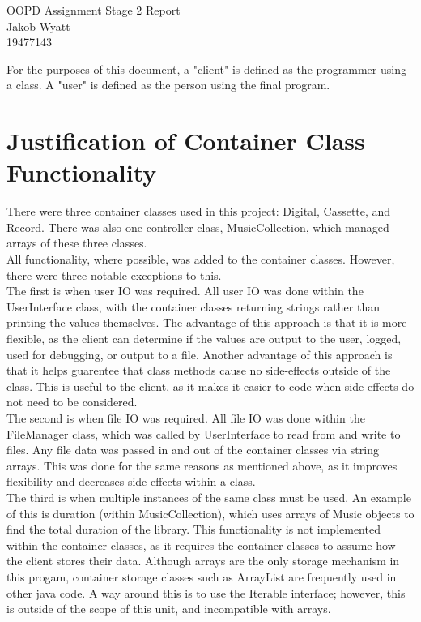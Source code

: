 \documentclass{article}
\begin{document}
\begin{center}
    \Huge
    OOPD Assignment Stage 2 Report\\
    \large
    Jakob Wyatt\\
    19477143
\end{center}

For the purposes of this document, a "client" is defined as the programmer
using a class. A "user" is defined as the person using the final program.

\section{Justification of Container Class Functionality}
There were three container classes used in this project:
Digital, Cassette, and Record. There was also one controller class,
MusicCollection, which managed arrays of these three classes.\\
All functionality, where possible, was added to the container classes.
However, there were three notable exceptions to this.\\
The first is when user IO was required. All user IO
was done within the UserInterface
class, with the container classes returning strings rather than printing
the values themselves. The advantage of this approach is that it is more
flexible, as the client can determine if the values are output to the user,
logged, used for debugging, or output to a file. Another advantage of this
approach is that it helps guarentee that class methods cause no side-effects
outside of the class. This is useful to the client, as it makes it easier
to code when side effects do not need to be considered.\\
The second is when file IO was required. All file IO was done within the
FileManager class, which was called by UserInterface to read from and 
write to files. Any file data was passed in and out of the container classes
via string arrays. This was done for the same reasons as mentioned above, 
as it improves flexibility and decreases side-effects within a class.\\
The third is when multiple instances of the same class must be used.
An example of this is duration (within MusicCollection),
which uses arrays of Music objects to find the total duration of the library.
This functionality is not implemented within the container classes,
as it requires the container classes to assume how the client stores their
data. Although arrays are the only storage mechanism in this progam,
container storage classes such as ArrayList are frequently used
in other java code. A way around this is to use the Iterable interface;
however, this is outside of the scope of this unit, and incompatible with
arrays.
\end{document}
